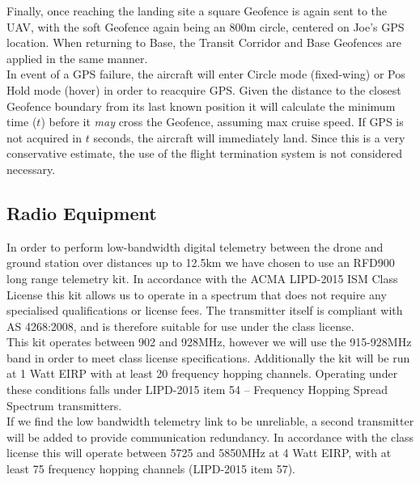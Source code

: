 Finally, once reaching the landing site a square Geofence is again sent to the UAV, with the soft Geofence again being an 800m circle, centered on Joe's GPS location. When returning to Base, the Transit Corridor and Base Geofences are applied in the same manner.\\

In event of a GPS failure, the aircraft will enter Circle mode (fixed-wing) or Pos Hold mode (hover) in order to reacquire GPS. Given the distance to the closest Geofence boundary from its last known position it will calculate the minimum time ($t$) before it \textit{may} cross the Geofence, assuming max cruise speed. If GPS is not acquired in $t$ seconds, the aircraft will immediately land. Since this is a very conservative estimate, the use of the flight termination system is not considered necessary.

\subsection{Radio Equipment}
In order to perform low-bandwidth digital telemetry between the drone and ground station over distances up to 12.5km we have chosen to use an RFD900 long range telemetry kit. In accordance with the ACMA LIPD-2015 ISM Class License this kit allows us to operate in a spectrum that does not require any specialised qualifications or license fees. The transmitter itself is compliant with AS 4268:2008, and is therefore suitable for use under the class license.\\

This kit operates between 902 and 928MHz, however we will use the 915-928MHz band in order to meet class license specifications.  Additionally the kit will be run at 1 Watt EIRP with at least 20 frequency hopping channels. Operating under these conditions falls under LIPD-2015 item 54 – Frequency Hopping Spread Spectrum transmitters.\\

If we find the low bandwidth telemetry link to be unreliable, a second transmitter will be added to provide communication redundancy. In accordance with the class license this will operate between 5725 and 5850MHz at 4 Watt EIRP, with at least 75 frequency hopping channels (LIPD-2015 item 57).